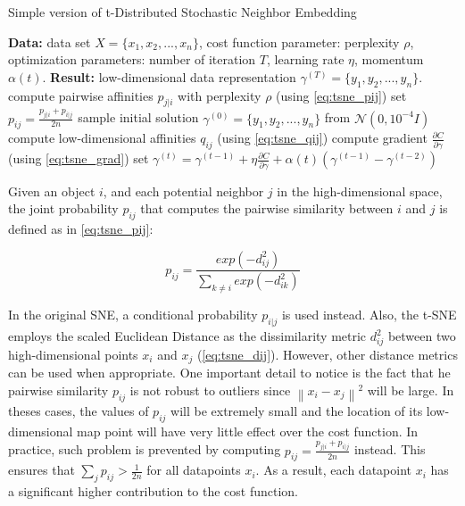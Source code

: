 \begin{algorithm}[t]
\caption{Simple version of t-Distributed Stochastic Neighbor Embedding}
\label{alg:tsne}
\begin{algorithmic}
    \State \textbf{Data:} data set $X = \{x_1, x_2, ..., x_n\}$,
    \State cost function parameter: perplexity $\rho$,
    \State optimization parameters: number of iteration $T$, learning rate $\eta$, momentum $\alpha(t)$.
    \State \textbf{Result:} low-dimensional data representation $\gamma^{(T)} = \{y_1, y_2, ..., y_n\}$.
    \Begin 
        \State compute pairwise affinities $p_{j|i}$ with perplexity $\rho$ (using \autoref{eq:tsne_pij})
        \State set $p_{ij} = \frac{p_{j|i} + p_{i|j}}{2n}$
        \State sample initial solution $\gamma^{(0)} = \{y_1, y_2, ..., y_n\}$ from $\mathcal{N}(0, 10^{-4}I)$
        \Begin
            \State compute low-dimensional affinities $q_{ij}$ (using \autoref{eq:tsne_qij})
            \State compute gradient $\frac{\partial C}{\partial \gamma}$ (using \autoref{eq:tsne_grad})
            \State set $\gamma^{(t)} = \gamma^{(t-1)} + \eta \frac{\partial C}{\partial \gamma} + \alpha(t)(\gamma^{(t-1)} - \gamma^{(t-2)})$
        \End
    \End
\end{algorithmic}
\end{algorithm}

Given an object $i$, and each potential neighbor $j$ in the high-dimensional space, the joint probability $p_{ij}$ that computes the pairwise similarity between $i$ and $j$ is defined as in \autoref{eq:tsne_pij}:

\begin{equation}
\label{eq:tsne_pij}
p_{ij} = \frac{exp(-d_{ij}^2)}{\sum_{k \neq i}exp(-d_{ik}^2)}
\end{equation}

In the original SNE, a conditional probability $p_{i|j}$ is used instead. Also, the t-SNE employs the scaled Euclidean Distance as the dissimilarity metric $d_{ij}^2$ between two high-dimensional points $x_i$ and $x_j$ (\autoref{eq:tsne_dij}). However, other distance metrics can be used when appropriate. One important detail to notice is the fact that he pairwise similarity $p_{ij}$ is not robust to outliers since $\left\| x_i - x_j\right\|^2$ will be large. In theses cases, the values of $p_{ij}$ will be extremely small and the location of its low-dimensional map point will have very little effect over the cost function. In practice, such problem is prevented by computing $p_{ij} = \frac{p_{j|i} + p_{i|j}}{2n}$ instead. This ensures that $\sum_j p_{ij} > \frac{1}{2n}$ for all datapoints $x_i$. As a result, each datapoint $x_i$ has a significant higher contribution to the cost function.

